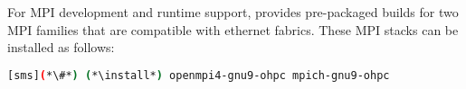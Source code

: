 For MPI development and runtime support, \OHPC{} provides pre-packaged builds
for two MPI families that are compatible with ethernet fabrics. These MPI
stacks can be installed as follows:

\begin{lstlisting}[language=bash]
[sms](*\#*) (*\install*) openmpi4-gnu9-ohpc mpich-gnu9-ohpc
\end{lstlisting}




